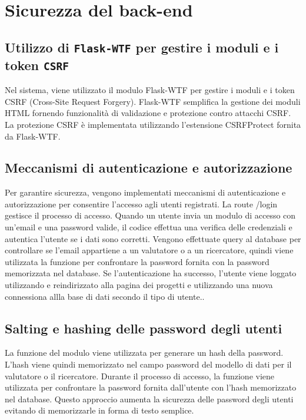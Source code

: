 \documentclass{report}
\begin{document}
\section{Sicurezza del back-end}



\subsection{Utilizzo di \texttt{Flask-WTF} per gestire i moduli e i token \texttt{CSRF}}
Nel sistema, viene utilizzato il modulo Flask-WTF per gestire i moduli e i token CSRF (Cross-Site Request Forgery). Flask-WTF semplifica la gestione dei moduli HTML fornendo funzionalità di validazione e protezione contro attacchi CSRF. La protezione CSRF è implementata utilizzando l'estensione CSRFProtect fornita da Flask-WTF.
\subsection{Meccanismi di autenticazione e autorizzazione}
Per garantire sicurezza, vengono implementati meccanismi di autenticazione e autorizzazione per consentire l'accesso agli utenti registrati.
La route /login gestisce il processo di accesso. Quando un utente invia un modulo di accesso con un'email e una password valide, il codice effettua una verifica delle credenziali e autentica l'utente se i dati sono corretti. Vengono effettuate query al database per controllare se l'email appartiene a un valutatore o a un ricercatore, quindi viene utilizzata la funzione  per confrontare la password fornita con la password memorizzata nel database. Se l'autenticazione ha successo, l'utente viene loggato utilizzando  e reindirizzato alla pagina dei progetti e utilizzando una nuova connessiona allla base di dati secondo il tipo di utente..
\subsection{Salting e hashing delle password degli utenti}
La funzione   del modulo   viene utilizzata per generare un hash della password. L'hash viene quindi memorizzato nel campo password del modello di dati per il valutatore o il ricercatore.
Durante il processo di accesso, la funzione   viene utilizzata per confrontare la password fornita dall'utente con l'hash memorizzato nel database. Questo approccio aumenta la sicurezza delle password degli utenti evitando di memorizzarle in forma di testo semplice.
\end{document}
